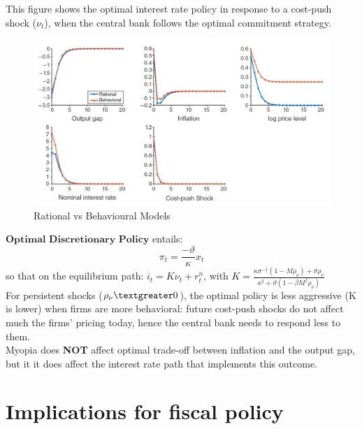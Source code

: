 \documentclass{beamer}
\newcommand\ReduceFont{\fontsize{10}{7.2}\selectfont}
\begin{document}
\begin{frame}{\subsecname}
    This figure shows the optimal interest rate policy in response to a cost-push shock ($\nu_{t}$), when the central bank follows the optimal commitment strategy.    
    \begin{figure}
        \centering
        \includegraphics[scale=0.6]{Graphs_Macro/Figure3.JPG}
        \caption{Rational vs Behavioural Models}
        \label{fig:3}
    \end{figure}
\end{frame}

\begin{frame}{\subsecname}
    $\textbf{Optimal Discretionary Policy}$ entails:
    \begin{equation}\tag{42}
        \pi_{t}=\frac{-\vartheta}{\kappa}x_{t}
    \end{equation}
    so that on the equilibrium path: $i_{t}=K\nu_{t}+r_{t}^{n}$, with $K=\frac{\kappa\sigma^{-1}\left(1-M\rho_{\nu}\right)+\vartheta\rho_{\nu}}{\kappa^{2}+\vartheta\left(1-\beta M^{f}\rho_{\nu}\right)}$\\
    \hfill \linebreak
    For persistent shocks ($\rho_{\nu} \textgreater 0$), the optimal policy is less aggressive (K is lower) when firms are more behavioral: future cost-push shocks do not affect much the firms’ pricing today, hence the central bank needs to respond less to them.\\
    \hfill \linebreak      
    Myopia does \textbf{NOT} affect optimal trade-off between inflation and the output gap, but it it does affect the interest rate path that implements this outcome.
\end{frame}

\section{Implications for fiscal policy}
\begin{frame}
    \ReduceFont
\end{frame}
\end{document}
